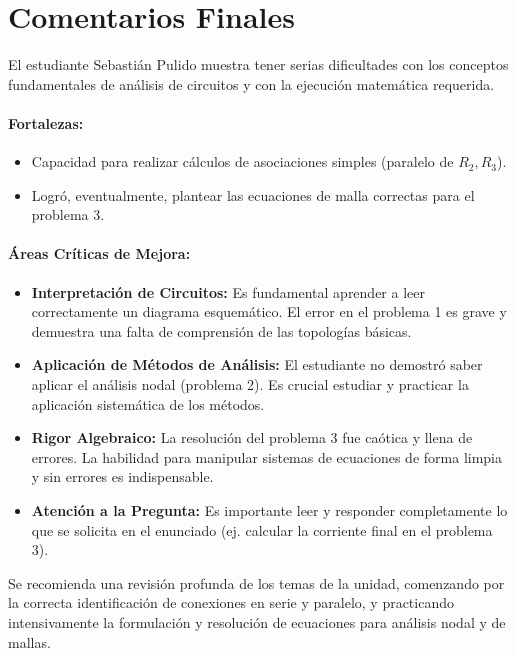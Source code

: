 \documentclass[12pt,a4paper]{article}
\begin{document}
\newpage

\section*{Comentarios Finales}

El estudiante Sebastián Pulido muestra tener serias dificultades con los conceptos fundamentales de análisis de circuitos y con la ejecución matemática requerida.

\paragraph{Fortalezas:}
\begin{itemize}
    \item Capacidad para realizar cálculos de asociaciones simples (paralelo de $R_2, R_3$).
    \item Logró, eventualmente, plantear las ecuaciones de malla correctas para el problema 3.
\end{itemize}

\paragraph{Áreas Críticas de Mejora:}
\begin{itemize}
    \item \textbf{Interpretación de Circuitos:} Es fundamental aprender a leer correctamente un diagrama esquemático. El error en el problema 1 es grave y demuestra una falta de comprensión de las topologías básicas.
    \item \textbf{Aplicación de Métodos de Análisis:} El estudiante no demostró saber aplicar el análisis nodal (problema 2). Es crucial estudiar y practicar la aplicación sistemática de los métodos.
    \item \textbf{Rigor Algebraico:} La resolución del problema 3 fue caótica y llena de errores. La habilidad para manipular sistemas de ecuaciones de forma limpia y sin errores es indispensable.
    \item \textbf{Atención a la Pregunta:} Es importante leer y responder completamente lo que se solicita en el enunciado (ej. calcular la corriente final en el problema 3).
\end{itemize}

Se recomienda una revisión profunda de los temas de la unidad, comenzando por la correcta identificación de conexiones en serie y paralelo, y practicando intensivamente la formulación y resolución de ecuaciones para análisis nodal y de mallas.
\end{document}
